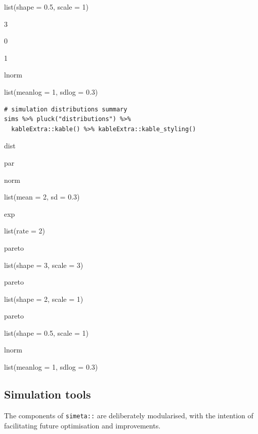\documentclass[
]{article}
\begin{document}
list(shape = 0.5, scale = 1)

3

0

1

lnorm

list(meanlog = 1, sdlog = 0.3)

\begin{verbatim}
# simulation distributions summary
sims %>% pluck("distributions") %>% 
  kableExtra::kable() %>% kableExtra::kable_styling()
\end{verbatim}

dist

par

norm

list(mean = 2, sd = 0.3)

exp

list(rate = 2)

pareto

list(shape = 3, scale = 3)

pareto

list(shape = 2, scale = 1)

pareto

list(shape = 0.5, scale = 1)

lnorm

list(meanlog = 1, sdlog = 0.3)

\hypertarget{simulation-tools}{%
\subsection{Simulation tools}\label{simulation-tools}}

The components of \texttt{simeta::} are deliberately modularised, with
the intention of facilitating future optimisation and improvements.
\end{document}
